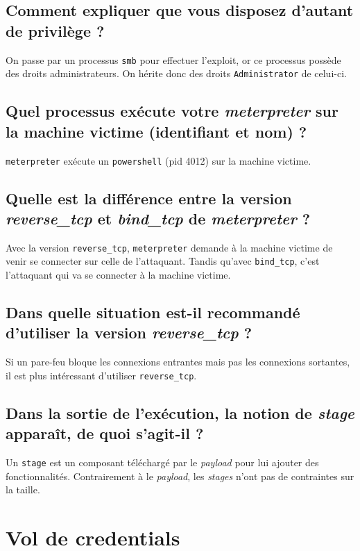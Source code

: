 \documentclass{extarticle} %
\begin{document}
    \subsection{Comment expliquer que vous disposez d’autant de privilège ?}
    On passe par un processus \texttt{smb} pour effectuer l'exploit, or ce processus possède des droits administrateurs. On hérite
    donc des droits \texttt{Administrator} de celui-ci.

    \subsection{Quel processus exécute votre \textit{meterpreter} sur la machine victime (identifiant et nom) ?}
    \texttt{meterpreter} exécute un \texttt{powershell} (pid 4012) sur la machine victime.

    \subsection{Quelle est la différence entre la version \textit{reverse\_tcp} et \textit{bind\_tcp} de \textit{meterpreter} ?}
    Avec la version \texttt{reverse\_tcp}, \texttt{meterpreter} demande à la machine victime de venir se connecter sur celle de l'attaquant.
    Tandis qu'avec \texttt{bind\_tcp}, c'est l'attaquant qui va se connecter à la machine victime.

    \subsection{Dans quelle situation est-il recommandé d’utiliser la version \textit{reverse\_tcp} ?}
    Si un pare-feu bloque les connexions entrantes mais pas les connexions sortantes, il est plus intéressant d'utiliser \texttt{reverse\_tcp}.

    \subsection{Dans la sortie de l’exécution, la notion de \textit{stage} apparaît, de quoi s’agit-il ?}
    Un \texttt{stage} est un composant téléchargé par le \textit{payload} pour lui ajouter des fonctionnalités.
    Contrairement à le \textit{payload}, les \textit{stages} n'ont pas de contraintes sur la taille.

    \section{Vol de credentials}
\end{document}
